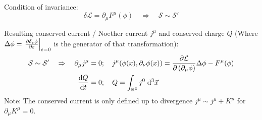 		\noindent
		Condition of invariance:
		\begin{equation}
			\delta\mathcal{L} = \partial_\mu F^\mu(\phi)
			\quad \Rightarrow \quad \mathcal{S} \sim \mathcal{S}'
		\end{equation}

		\noindent
		Resulting conserved current / Noether current $j^{\mu}$ and conserved charge $Q$ (Where $\Delta \phi = \eval{\pdv{\delta_\varepsilon \phi}{\varepsilon}}_{\varepsilon=0}$ is the generator of that transformation):
		\begin{equation}
			\begin{aligned}
				\mathcal{S} \sim \mathcal{S}' \quad\Rightarrow\quad
				\partial_\mu j^\mu &= 0;\quad
				j^\mu \qty( \phi(x), \partial_\nu\phi(x) ) = \pdv{\mathcal{L}}{\left(\partial_\mu \phi\right)}\Delta\phi - F^\mu(\phi) \\
				\dv{Q}{t} &= 0; \quad Q = \int_{\mathbb{R}^3} j^0\;\dd^3\vec{x} \\
			\end{aligned}
		\end{equation}
		Note: The conserved current is only defined up to divergence $j^\mu \sim j^\mu + K^\mu$ for $\partial_\mu K^\mu = 0$.